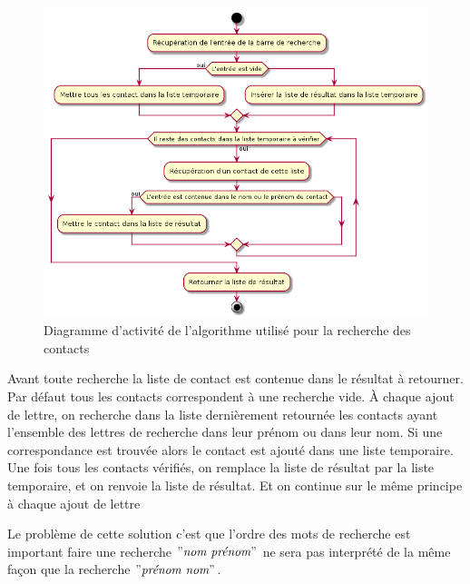 \begin{figure}[!h]
	\centering
	\includegraphics[scale=0.6]{img/activity_retrieve_new.png}
	\caption{\label{activity_retrieve_new} {Diagramme d'activité de l'algorithme utilisé pour la recherche des contacts}}
\end{figure}

Avant toute recherche la liste de contact est contenue dans le résultat à retourner. Par défaut tous les contacts correspondent à une recherche vide. À chaque ajout de lettre, on recherche dans la liste dernièrement retournée les contacts ayant l'ensemble des lettres de recherche dans leur prénom ou dans leur nom. Si une correspondance est trouvée alors le contact est ajouté dans une liste temporaire. Une fois tous les contacts vérifiés, on remplace la liste de résultat par la liste temporaire, et on renvoie la liste de résultat. Et on continue sur le même principe à chaque ajout de lettre

\newpage

Le problème de cette solution c'est que l'ordre des mots de recherche est important faire une recherche $"\textit{nom prénom}"$ ne sera pas interprété de la même façon que la recherche $"\textit{prénom nom}"$.

